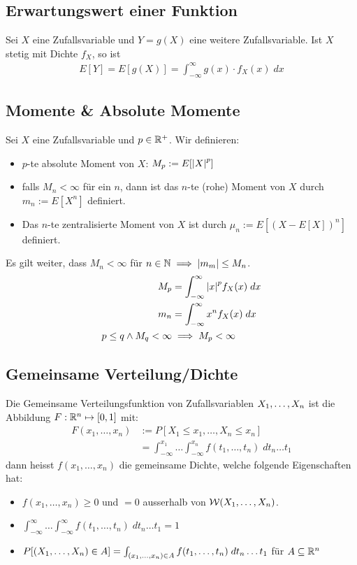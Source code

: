 \subsection*{Erwartungswert einer Funktion}
Sei $X$ eine Zufallsvariable und $Y = g (X)$ eine weitere Zufallsvariable. Ist
$X$ stetig mit Dichte $f_X$, so ist
\begin{align*}
  E[Y] = E[g (X)] = \int_{-\infty}^\infty g (x) \cdot f_X (x) \; dx
\end{align*}
\subsection*{Momente \& Absolute Momente}
Sei $X$ eine Zufallsvariable und $p \in \mathbb{R}^+$. Wir definieren:
\begin{itemize}
  \item $p$-te absolute Moment von $X$: $M_p := E[\abs{X}^p]$
  \item falls $M_n < \infty$ für ein $n$, dann ist das $n$-te (rohe) Moment von $X$
        durch $m_n := E[X^n]$ definiert.
  \item Das $n$-te zentralisierte Moment von $X$ ist durch $\mu_n := E[(X - E[X])^n]$
        definiert.
\end{itemize}
Es gilt weiter, dass $M_n < \infty$ für $n \in \mathbb{N} \implies \abs{m_m} \leq M_n$.
\begin{align*}
  M_p                         & = \int_{-\infty}^\infty \abs{x}^p f_X (x) \; dx \\
  m_n                         & = \int_{-\infty}^\infty x^n f_X (x) \; dx       \\
  p \leq q \land M_q < \infty & \implies M_p < \infty
\end{align*}
\subsection*{Gemeinsame Verteilung/Dichte}
Die Gemeinsame Verteilungsfunktion von Zufallsvariablen $X_1, \dots, X_n$ ist die Abbildung $F: \mathbb{R}^n \mapsto [0, 1]$ mit:
\begin{align*}
  F (x_1, \dots, x_n) & := P[X_1 \leq x_1, \dots, X_n \leq x_n]                                                 \\
                      & = \int_{-\infty}^{x_1} \dots \int_{-\infty}^{x_n} f (t_1, \dots, t_n) \; dt_n \dots t_1
\end{align*}
dann heisst $f (x_1, \dots, x_n)$ die gemeinsame Dichte, welche folgende
Eigenschaften hat:
\begin{itemize}
  \item $f (x_1, \dots, x_n) \geq 0$ und $= 0$ ausserhalb von $\mathcal{W} (X_1, \dots, X_n)$.
  \item $\int_{-\infty}^\infty \dots \int_{-\infty}^\infty f (t_1, \dots, t_n) \; dt_n \dots t_1 = 1$
  \item $P[ (X_1, \dots, X_n) \in A] = \int_{ (x_1, \dots, x_n) \in A} f (t_1, \dots, t_n) \; dt_n \dots t_1$ für $A \subseteq \mathbb{R}^n$
\end{itemize}

